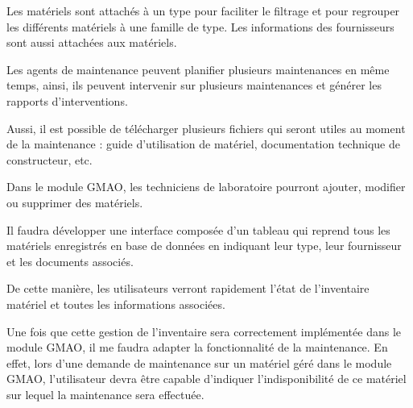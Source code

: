 Les matériels sont attachés à un type pour faciliter le filtrage et pour regrouper les 
différents matériels à une famille de type. Les informations des fournisseurs sont 
aussi attachées aux matériels.

 Les agents de maintenance peuvent planifier plusieurs maintenances en même temps, 
 ainsi, ils peuvent intervenir sur plusieurs maintenances et générer les rapports 
 d’interventions.

Aussi, il est possible de télécharger plusieurs fichiers qui seront utiles au moment 
de la maintenance : guide d’utilisation de matériel, documentation technique de 
constructeur, etc.

Dans le module GMAO, les techniciens de laboratoire pourront ajouter, modifier ou 
supprimer des matériels. 

Il faudra développer une interface composée d’un tableau qui reprend tous les 
matériels enregistrés en base de données en indiquant leur type, leur fournisseur 
et les documents associés. 

De cette manière, les utilisateurs verront rapidement l’état de l’inventaire matériel 
et toutes les informations associées.

Une fois que cette gestion de l’inventaire sera correctement implémentée dans le 
module GMAO, il me faudra adapter la fonctionnalité de la maintenance. En effet, 
lors d’une demande de maintenance sur un matériel géré dans le module GMAO, 
l’utilisateur devra être capable d’indiquer l’indisponibilité de ce matériel sur 
lequel la maintenance sera effectuée.
\pagebreak